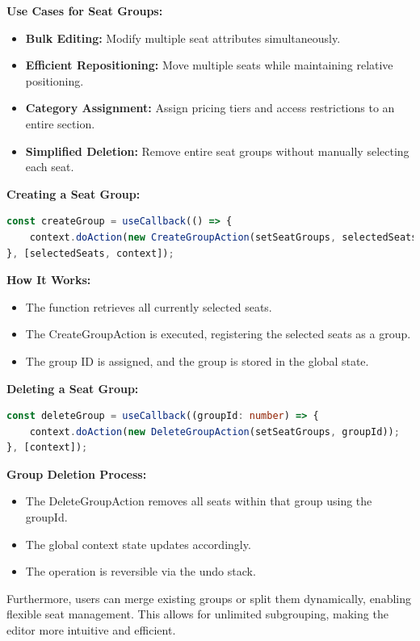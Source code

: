 \textbf{Use Cases for Seat Groups:}
\begin{itemize}
    \item \textbf{Bulk Editing:} Modify multiple seat attributes simultaneously.
    \item \textbf{Efficient Repositioning:} Move multiple seats while maintaining relative positioning.
    \item \textbf{Category Assignment:} Assign pricing tiers and access restrictions to an entire section.
    \item \textbf{Simplified Deletion:} Remove entire seat groups without manually selecting each seat.
\end{itemize}

\textbf{Creating a Seat Group:}
\begin{lstlisting}[language=TypeScript, caption=Creating Seat Groups, label=lst:create-seat-group]
const createGroup = useCallback(() => {
    context.doAction(new CreateGroupAction(setSeatGroups, selectedSeats));
}, [selectedSeats, context]);
\end{lstlisting}

\textbf{How It Works:}
\begin{itemize}
    \item The function retrieves all currently selected seats.
    \item The CreateGroupAction is executed, registering the selected seats as a group.
    \item The group ID is assigned, and the group is stored in the global state.
\end{itemize}

\textbf{Deleting a Seat Group:}
\begin{lstlisting}[language=TypeScript, caption=Deleting Seat Groups, label=lst:delete-seat-group]
const deleteGroup = useCallback((groupId: number) => {
    context.doAction(new DeleteGroupAction(setSeatGroups, groupId));
}, [context]);
\end{lstlisting}

\textbf{Group Deletion Process:}
\begin{itemize}
    \item The DeleteGroupAction removes all seats within that group using the groupId.
    \item The global context state updates accordingly.
    \item The operation is reversible via the undo stack.
\end{itemize}

Furthermore, users can merge existing groups or split them dynamically, enabling flexible seat management. This allows for unlimited subgrouping, making the editor more intuitive and efficient.

